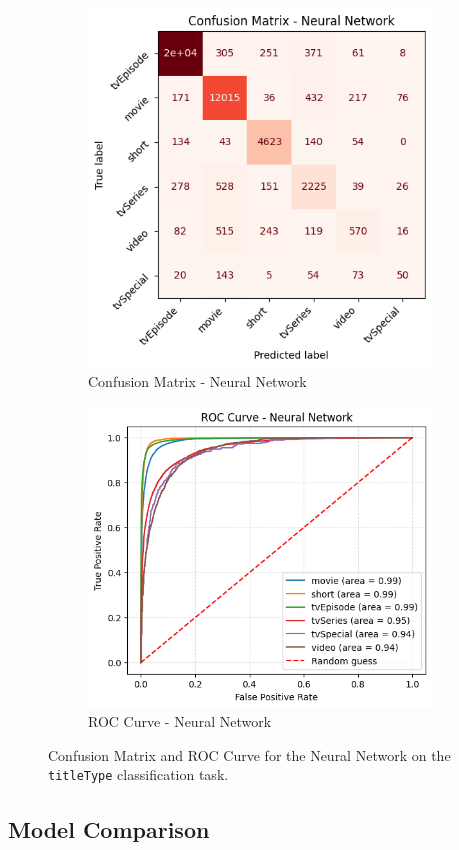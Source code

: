 
\begin{figure}
    \centering
    \begin{subfigure}[b]{0.44\textwidth}
        \centering
        \includegraphics[width=\textwidth]{plotsss/cm_nn_titletype.png}
        \caption{Confusion Matrix - Neural Network}
        \label{fig:cm_nn_titletype}
    \end{subfigure}
    \hfill
    \begin{subfigure}[b]{0.52\textwidth}
        \centering
        \includegraphics[width=\textwidth]{plotsss/roc_nn_titletype.png}
        \caption{ROC Curve - Neural Network}
        \label{fig:roc_nn_titletype}
    \end{subfigure}
    \caption{Confusion Matrix and ROC Curve for the Neural Network on the \texttt{titleType} classification task.}
    \label{fig:cm_nn_titletype}
\end{figure}




\subsection{Model Comparison}
